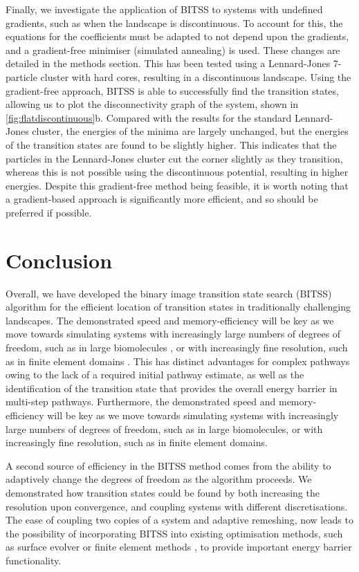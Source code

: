 \documentclass[twocolumn,10pt]{revtex4}
\begin{document}
Finally, we investigate the application of BITSS to systems with undefined gradients, such as when the landscape is discontinuous.
To account for this, the equations for the coefficients must be adapted to not depend upon the gradients, and a gradient-free minimiser (simulated annealing) is used.
These changes are detailed in the methods section.
This has been tested using a Lennard-Jones 7-particle cluster with hard cores, resulting in a discontinuous landscape.
Using the gradient-free approach, BITSS is able to successfully find the transition states, allowing us to plot the disconnectivity graph of the system, shown in \cref{fig:flatdiscontinuous}b.
Compared with the results for the standard Lennard-Jones cluster, the energies of the minima are largely unchanged, but the energies of the transition states are found to be slightly higher.
This indicates that the particles in the Lennard-Jones cluster cut the corner slightly as they transition, whereas this is not possible using the discontinuous potential, resulting in higher energies.
Despite this gradient-free method being feasible, it is worth noting that a gradient-based approach is significantly more efficient, and so should be preferred if possible.


\section{Conclusion}
Overall, we have developed the binary image transition state search (BITSS) algorithm for the efficient location of transition states in traditionally challenging landscapes.
The demonstrated speed and memory-efficiency will be key as we move towards simulating systems with increasingly large numbers of degrees of freedom, such as in large biomolecules \cite{Lee2018}, or with increasingly fine resolution, such as in finite element domains \cite{Kolev2021}.
This has distinct advantages for complex pathways owing to the lack of a required initial pathway estimate, as well as the identification of the transition state that provides the overall energy barrier in multi-step pathways.
Furthermore, the demonstrated speed and memory-efficiency will be key as we move towards simulating systems with increasingly large numbers of degrees of freedom, such as in large biomolecules, or with increasingly fine resolution, such as in finite element domains.

A second source of efficiency in the BITSS method comes from the ability to adaptively change the degrees of freedom as the algorithm proceeds.
We demonstrated how transition states could be found by both increasing the resolution upon convergence, and coupling systems with different discretisations.
The ease of coupling two copies of a system and adaptive remeshing, now leads to the possibility of incorporating BITSS into existing optimisation methods, such as surface evolver \cite{Brakke1992} or finite element methods \cite{Kolev2021}, to provide important energy barrier functionality.
\end{document}
